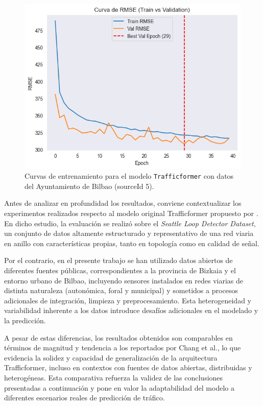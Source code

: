 \begin{figure}[H]
\begin{minipage}{0.48\textwidth}
		\vspace{0.2cm}
		\includegraphics[width=\linewidth]{includes/cap5/graphs/sid5_trafficformer_rmse.png}
	\end{minipage}
	\caption{Curvas de entrenamiento para el modelo \texttt{Trafficformer} con datos del Ayuntamiento de Bilbao (sourceId 5).}
	\label{fig:curvas_sid5_trafficformer}
\end{figure}

Antes de analizar en profundidad los resultados, conviene contextualizar los experimentos realizados respecto al modelo original Trafficformer propuesto por \cite{trafficformer}. En dicho estudio, la evaluación se realizó sobre el \textit{Seattle Loop Detector Dataset}, un conjunto de datos altamente estructurado y representativo de una red viaria en anillo con características propias, tanto en topología como en calidad de señal.

Por el contrario, en el presente trabajo se han utilizado datos abiertos de diferentes fuentes públicas, correspondientes a la provincia de Bizkaia y el entorno urbano de Bilbao, incluyendo sensores instalados en redes viarias de distinta naturaleza (autonómica, foral y municipal) y sometidos a procesos adicionales de integración, limpieza y preprocesamiento. Esta heterogeneidad y variabilidad inherente a los datos introduce desafíos adicionales en el modelado y la predicción.

A pesar de estas diferencias, los resultados obtenidos son comparables en términos de magnitud y tendencia a los reportados por Chang et al., lo que evidencia la solidez y capacidad de generalización de la arquitectura Trafficformer, incluso en contextos con fuentes de datos abiertas, distribuidas y heterogéneas. Esta comparativa refuerza la validez de las conclusiones presentadas a continuación y pone en valor la adaptabilidad del modelo a diferentes escenarios reales de predicción de tráfico.

